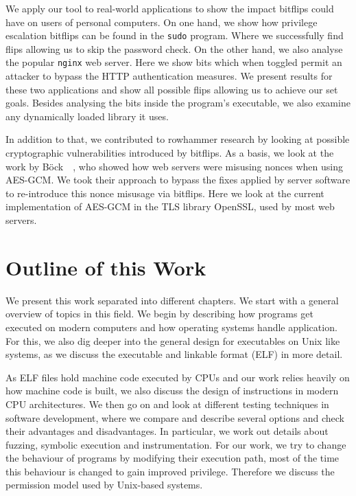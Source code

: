 We apply our tool to real-world applications to show the impact bitflips could
have on users of personal computers. On one hand, we show how privilege
escalation bitflips can be found in the \texttt{sudo} program. Where we
successfully find flips allowing us to skip the password check. On the other
hand, we also analyse the popular \texttt{nginx} web server. Here we show bits
which when toggled permit an attacker to bypass the HTTP authentication
measures. We present results for these two applications and show all possible
flips allowing us to achieve our set goals. Besides analysing the bits inside
the program's executable, we also examine any dynamically loaded library it
uses.

In addition to that, we contributed to rowhammer research by looking at possible
cryptographic vulnerabilities introduced by bitflips. As a basis, we look at the
work by Böck~\etal~\cite{gcmnonceattack}, who showed how web servers were
misusing nonces when using AES-GCM. We took their approach to bypass the fixes
applied by server software to re-introduce this nonce misusage via bitflips.
Here we look at the current implementation of AES-GCM in the TLS library
OpenSSL, used by most web servers.

\section{Outline of this Work}

We present this work separated into different chapters. We start with a general
overview of topics in this field. We begin by describing how programs get
executed on modern computers and how operating systems handle application. For
this, we also dig deeper into the general design for executables on Unix like
systems, as we discuss the executable and linkable format (ELF) in more detail.

As ELF files hold machine code executed by CPUs and our work relies heavily on
how machine code is built, we also discuss the design of instructions in modern
CPU architectures.  We then go on and look at different testing techniques in
software development, where we compare and describe several options and check
their advantages and disadvantages. In particular, we work out details about
fuzzing, symbolic execution and instrumentation. For our work, we try to change
the behaviour of programs by modifying their execution path, most of the time
this behaviour is changed to gain improved privilege. Therefore we discuss the
permission model used by Unix-based systems.

